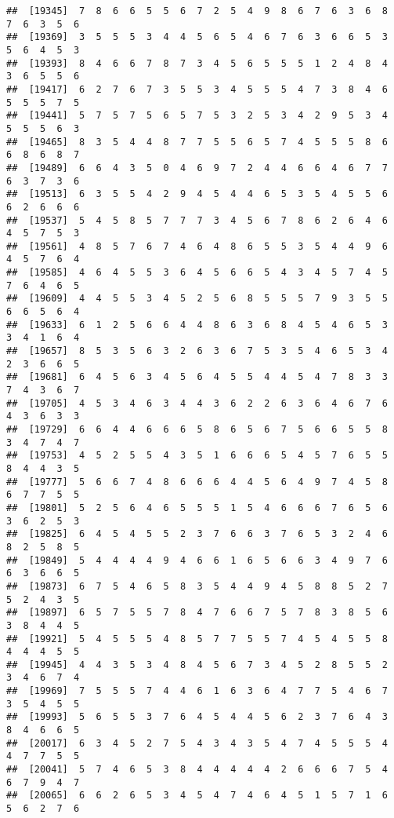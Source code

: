 \documentclass[
]{book}
\begin{document}
\begin{verbatim}
##  [19345]  7  8  6  6  5  5  6  7  2  5  4  9  8  6  7  6  3  6  8  7  6  3  5  6
##  [19369]  3  5  5  5  3  4  4  5  6  5  4  6  7  6  3  6  6  5  3  5  6  4  5  3
##  [19393]  8  4  6  6  7  8  7  3  4  5  6  5  5  5  1  2  4  8  4  3  6  5  5  6
##  [19417]  6  2  7  6  7  3  5  5  3  4  5  5  5  4  7  3  8  4  6  5  5  5  7  5
##  [19441]  5  7  5  7  5  6  5  7  5  3  2  5  3  4  2  9  5  3  4  5  5  5  6  3
##  [19465]  8  3  5  4  4  8  7  7  5  5  6  5  7  4  5  5  5  8  6  6  8  6  8  7
##  [19489]  6  6  4  3  5  0  4  6  9  7  2  4  4  6  6  4  6  7  7  6  3  7  3  6
##  [19513]  6  3  5  5  4  2  9  4  5  4  4  6  5  3  5  4  5  5  6  6  2  6  6  6
##  [19537]  5  4  5  8  5  7  7  7  3  4  5  6  7  8  6  2  6  4  6  4  5  7  5  3
##  [19561]  4  8  5  7  6  7  4  6  4  8  6  5  5  3  5  4  4  9  6  4  5  7  6  4
##  [19585]  4  6  4  5  5  3  6  4  5  6  6  5  4  3  4  5  7  4  5  7  6  4  6  5
##  [19609]  4  4  5  5  3  4  5  2  5  6  8  5  5  5  7  9  3  5  5  6  6  5  6  4
##  [19633]  6  1  2  5  6  6  4  4  8  6  3  6  8  4  5  4  6  5  3  3  4  1  6  4
##  [19657]  8  5  3  5  6  3  2  6  3  6  7  5  3  5  4  6  5  3  4  2  3  6  6  5
##  [19681]  6  4  5  6  3  4  5  6  4  5  5  4  4  5  4  7  8  3  3  7  4  3  6  7
##  [19705]  4  5  3  4  6  3  4  4  3  6  2  2  6  3  6  4  6  7  6  4  3  6  3  3
##  [19729]  6  6  4  4  6  6  6  5  8  6  5  6  7  5  6  6  5  5  8  3  4  7  4  7
##  [19753]  4  5  2  5  5  4  3  5  1  6  6  6  5  4  5  7  6  5  5  8  4  4  3  5
##  [19777]  5  6  6  7  4  8  6  6  6  4  4  5  6  4  9  7  4  5  8  6  7  7  5  5
##  [19801]  5  2  5  6  4  6  5  5  5  1  5  4  6  6  6  7  6  5  6  3  6  2  5  3
##  [19825]  6  4  5  4  5  5  2  3  7  6  6  3  7  6  5  3  2  4  6  8  2  5  8  5
##  [19849]  5  4  4  4  4  9  4  6  6  1  6  5  6  6  3  4  9  7  6  6  3  6  6  5
##  [19873]  6  7  5  4  6  5  8  3  5  4  4  9  4  5  8  8  5  2  7  5  2  4  3  5
##  [19897]  6  5  7  5  5  7  8  4  7  6  6  7  5  7  8  3  8  5  6  3  8  4  4  5
##  [19921]  5  4  5  5  5  4  8  5  7  7  5  5  7  4  5  4  5  5  8  4  4  4  5  5
##  [19945]  4  4  3  5  3  4  8  4  5  6  7  3  4  5  2  8  5  5  2  3  4  6  7  4
##  [19969]  7  5  5  5  7  4  4  6  1  6  3  6  4  7  7  5  4  6  7  3  5  4  5  5
##  [19993]  5  6  5  5  3  7  6  4  5  4  4  5  6  2  3  7  6  4  3  8  4  6  6  5
##  [20017]  6  3  4  5  2  7  5  4  3  4  3  5  4  7  4  5  5  5  4  4  7  7  5  5
##  [20041]  5  7  4  6  5  3  8  4  4  4  4  4  2  6  6  6  7  5  4  6  7  9  4  7
##  [20065]  6  6  2  6  5  3  4  5  4  7  4  6  4  5  1  5  7  1  6  5  6  2  7  6

\end{verbatim}
\end{document}
